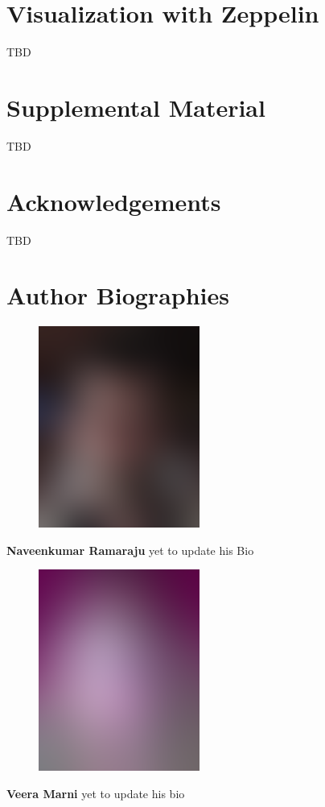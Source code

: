 \documentclass[9pt,twocolumn,twoside]{styles/osajnl}
\begin{document}
\section{Visualization with Zeppelin}
TBD

\section{Supplemental Material}
TBD

\section*{Acknowledgements}

TBD




 
\section*{Author Biographies}
\begingroup
\setlength\intextsep{0pt}
\begin{minipage}[t][3.2cm][t]{1.0\columnwidth} %
  \begin{figure}
    \includegraphics[width=0.25\columnwidth]{images/john_smith.eps}
  \end{figure}
  \noindent
  {\bfseries Naveenkumar Ramaraju} yet to update his Bio\end{minipage}
\begin{minipage}[t][3.2cm][t]{1.0\columnwidth} %
  \begin{figure}
    \includegraphics[width=0.25\columnwidth]{images/alice_smith.eps}
  \end{figure}
  \noindent
  {\bfseries Veera Marni} yet to update his bio
\end{minipage}
\end{document}
